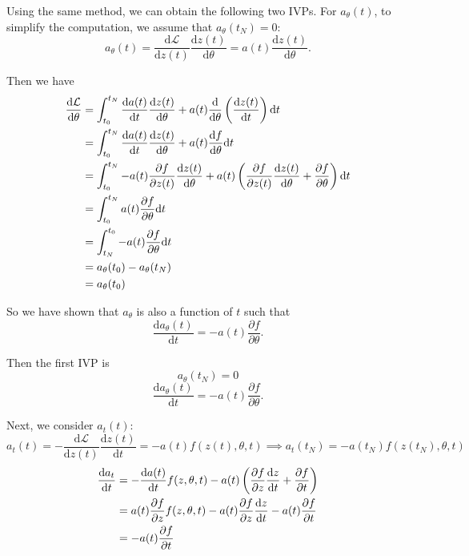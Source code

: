 \documentclass[a4paper,11pt,titlepage]{article}
\theoremstyle{definition}
\theoremstyle{plain}
\theoremstyle{remark}
\begin{document}
Using the same method, we can obtain the following two IVPs. For $a_\theta(t)$, to simplify the computation, we assume that $a_\theta(t_N)=0$:
$$
a_{\theta}(t) = \frac{\mathrm{d}\mathcal{L}}{\mathrm{d}z(t)}\frac{\mathrm{d}z(t)}{\mathrm{d}\theta}=a(t)\frac{\mathrm{d}z(t)}{\mathrm{d}\theta}.
$$

Then we have
\begin{align}
\frac{\mathrm{d}\mathcal{L}}{\mathrm{d}\theta}&=\int_{t_0}^{t_N}\frac{\mathrm{d}a(t)}{\mathrm{d}t}\frac{\mathrm{d}z(t)}{\mathrm{d}\theta}+a(t)\frac{\mathrm{d}}{\mathrm{d}\theta}\left(\frac{\mathrm{d}z(t)}{\mathrm{d}t}\right)\mathrm{d}t\notag\\
&=\int_{t_0}^{t_N}\frac{\mathrm{d}a(t)}{\mathrm{d}t}\frac{\mathrm{d}z(t)}{\mathrm{d}\theta}+a(t)\frac{\mathrm{d}f}{\mathrm{d}\theta}\mathrm{d}t\notag\\
&=\int_{t_0}^{t_N}-a(t)\frac{\partial f}{\partial z(t)}\frac{\mathrm{d}z(t)}{\mathrm{d}\theta}+a(t)\left(\frac{\partial f}{\partial z(t)}\frac{\mathrm{d}z(t)}{\mathrm{d}\theta}+\frac{\partial f}{\partial \theta}\right)\mathrm{d}t\notag\\
&=\int_{t_0}^{t_N}a(t)\frac{\partial f}{\partial \theta}\mathrm{d}t\notag\\
&=\int_{t_N}^{t_0}-a(t)\frac{\partial f}{\partial \theta}\mathrm{d}t\notag\\
&=a_{\theta}(t_0)-a_{\theta}(t_N)\notag\\
&=a_{\theta}(t_0)\notag
\end{align}

So we have shown that $a_{\theta}$ is also a function of $t$ such that $$\frac{\mathrm{d}a_{\theta}(t)}{\mathrm{d}t} = -a(t)\frac{\partial f}{\partial \theta}.$$

Then the first IVP is 
$$a_\theta(t_N)=0$$
\begin{equation}\label{eq6}
    \frac{\mathrm{d}a_{\theta}(t)}{\mathrm{d}t} = -a(t)\frac{\partial f}{\partial \theta}.\tag{6}
\end{equation}

Next, we consider $a_t(t)$:
$$
a_t(t) = -\frac{\mathrm{d}\mathcal{L}}{\mathrm{d}z(t)}\frac{\mathrm{d}z(t)}{\mathrm{d}t}=-a(t)f(z(t),\theta, t)\implies a_t(t_N) = -a(t_N)f(z(t_N),\theta, t)
$$
\begin{align}
\frac{\mathrm{d}a_t}{\mathrm{d}t}&=-\frac{\mathrm{d}a(t)}{\mathrm{d}t}f(z,\theta,t)-a(t)\left(\frac{\partial f}{\partial z}\frac{\mathrm{d}z}{\mathrm{d}t}+\frac{\partial f}{\partial t}\right)\notag\\
&=a(t)\frac{\partial f}{\partial z}f(z,\theta,t)-a(t)\frac{\partial f}{\partial z}\frac{\mathrm{d}z}{\mathrm{d}t}-a(t)\frac{\partial f}{\partial t}\notag\\
&=-a(t)\frac{\partial f}{\partial t}\notag
\end{align}
\end{document}
